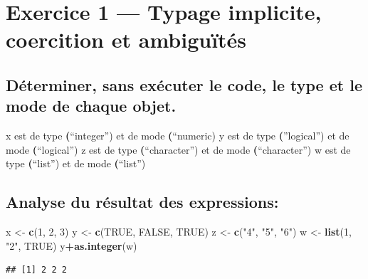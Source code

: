 \documentclass[
  11pt,
]{article}
\author{}
\date{\vspace{-2.5em}}
\newenvironment{Shaded}{\begin{snugshade}}{\end{snugshade}}
\newcommand{\ConstantTok}[1]{\textcolor[rgb]{0.56,0.35,0.01}{#1}}
\newcommand{\DecValTok}[1]{\textcolor[rgb]{0.00,0.00,0.81}{#1}}
\newcommand{\FunctionTok}[1]{\textcolor[rgb]{0.13,0.29,0.53}{\textbf{#1}}}
\newcommand{\NormalTok}[1]{#1}
\newcommand{\OtherTok}[1]{\textcolor[rgb]{0.56,0.35,0.01}{#1}}
\newcommand{\SpecialCharTok}[1]{\textcolor[rgb]{0.81,0.36,0.00}{\textbf{#1}}}
\newcommand{\StringTok}[1]{\textcolor[rgb]{0.31,0.60,0.02}{#1}}
\begin{document}
\newpage

\section{Exercice 1 --- Typage implicite, coercition et
ambiguïtés}\label{exercice-1-typage-implicite-coercition-et-ambiguuxeftuxe9s}

\subsection{Déterminer, sans exécuter le code, le type et le mode de
chaque
objet.}\label{duxe9terminer-sans-exuxe9cuter-le-code-le-type-et-le-mode-de-chaque-objet.}

x est de type \textbf(``integer'') et de mode \textbf(``numeric) y est
de type \textbf(''logical'') et de mode \textbf(``logical'') z est de
type \textbf(``character'') et de mode \textbf(``character'') w est de
type \textbf(``list'') et de mode \textbf(``list'')

\subsection{Analyse du résultat des
expressions:}\label{analyse-du-ruxe9sultat-des-expressions}

\begin{Shaded}
\begin{Highlighting}[]
\NormalTok{x }\OtherTok{\textless{}{-}} \FunctionTok{c}\NormalTok{(}\DecValTok{1}\NormalTok{, }\DecValTok{2}\NormalTok{, }\DecValTok{3}\NormalTok{)}
\NormalTok{y }\OtherTok{\textless{}{-}} \FunctionTok{c}\NormalTok{(}\ConstantTok{TRUE}\NormalTok{, }\ConstantTok{FALSE}\NormalTok{, }\ConstantTok{TRUE}\NormalTok{)}
\NormalTok{z }\OtherTok{\textless{}{-}} \FunctionTok{c}\NormalTok{(}\StringTok{"4"}\NormalTok{, }\StringTok{"5"}\NormalTok{, }\StringTok{"6"}\NormalTok{)}
\NormalTok{w }\OtherTok{\textless{}{-}} \FunctionTok{list}\NormalTok{(}\DecValTok{1}\NormalTok{, }\StringTok{"2"}\NormalTok{, }\ConstantTok{TRUE}\NormalTok{)}
\NormalTok{y}\SpecialCharTok{+}\FunctionTok{as.integer}\NormalTok{(w)}
\end{Highlighting}
\end{Shaded}

\begin{verbatim}
## [1] 2 2 2
\end{verbatim}
\end{document}
